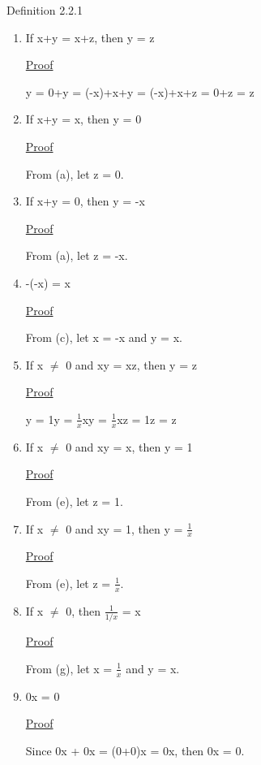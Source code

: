 { \color{blue} Definition 2.2.1 }
\begin{enumerate}[label=(\alph*), leftmargin=2cm]
	\item If x+y = x+z, then y = z

		{ \color{magenta} \underline{Proof}  }
		
		\qquad y = 0+y = (-x)+x+y = (-x)+x+z = 0+z = z
	
	\item If x+y = x, then y = 0

		{ \color{magenta} \underline{Proof} }

		\qquad From (a), let z = 0.
	
	\item If x+y = 0, then y = -x
	
		{ \color{magenta} \underline{Proof} }

		\qquad From (a), let z = -x.
	
	\item -(-x) = x

		{ \color{magenta} \underline{Proof} }

		\qquad From (c), let x = -x and y = x.
	
	\item If x $\not =$ 0 and xy = xz, then y = z

		{ \color{magenta} \underline{Proof} } 
		
		\qquad y = 1y = $\frac{1}{x}$xy = $\frac{1}{x}$xz = 1z = z 
	
	\item If x $\not =$ 0 and xy = x, then y = 1

		{ \color{magenta} \underline{Proof} } 
		
		\qquad From (e), let z = 1.
	
	\item If x $\not =$ 0 and xy = 1, then y = $\frac{1}{x}$

		{ \color{magenta} \underline{Proof} } 
		
		\qquad From (e), let z = $\frac{1}{x}$.
	
	\item If x $\not =$ 0, then $\frac{1}{1/x}$ = x

		{ \color{magenta} \underline{Proof} } 
		
		\qquad From (g), let x = $\frac{1}{x}$ and y = x.
	
	\item 0x = 0

		{ \color{magenta} \underline{Proof} } 
		
		\qquad Since 0x + 0x = (0+0)x = 0x, then 0x = 0.
	

\end{enumerate}
